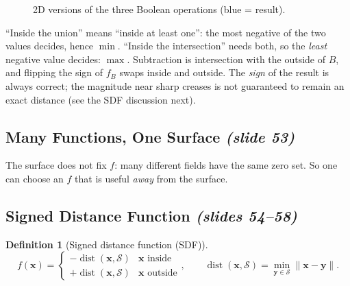 \documentclass[11pt,a4paper]{article}
\newcommand{\Surf}{\mathcal{S}}
\newcommand{\vx}{\bm{x}}
\newcommand{\vy}{\bm{y}}
\newcommand{\norm}[1]{\lVert #1\rVert}
\DeclareMathOperator{\dist}{dist}
\theoremstyle{definition}
\newtheorem{definition}{Definition}[section]
\theoremstyle{plain}
\theoremstyle{remark}
\newcommand{\slides}[1]{\texorpdfstring{\emph{(#1)}}{(#1)}}
\begin{document}
\begin{figure}[ht]
\centering
{}
\caption{2D versions of the three Boolean operations (blue = result).}
\end{figure}

\begin{intuition}
``Inside the union'' means ``inside at least one'': the most negative of the two values decides, hence $\min$. ``Inside the intersection'' needs both, so the \emph{least} negative value decides: $\max$. Subtraction is intersection with the outside of $B$, and flipping the sign of $f_B$ swaps inside and outside. The \emph{sign} of the result is always correct; the magnitude near sharp creases is not guaranteed to remain an exact distance (see the SDF discussion next).
\end{intuition}

\subsection{Many Functions, One Surface \slides{slide 53}}
The surface does not fix $f$: many different fields have the same zero set. So one can choose an $f$ that is useful \emph{away} from the surface.

\subsection{Signed Distance Function \slides{slides 54--58}}
\begin{definition}[Signed distance function (SDF)]
\[
f(\vx)=\begin{cases}-\dist(\vx,\Surf)&\vx\text{ inside}\\ +\dist(\vx,\Surf)&\vx\text{ outside}\end{cases},\qquad \dist(\vx,\Surf)=\min_{\vy\in\Surf}\norm{\vx-\vy}.
\]
\end{definition}
\end{document}
